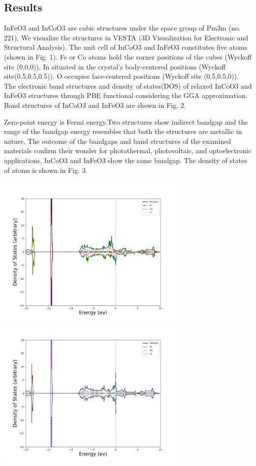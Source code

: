 \documentclass[12pt, letterpaper]{article}
\newcommand*{\1}{\hspace{1pt}}
\begin{document}
    \subsection*{Results}
    InFeO3 and InCoO3 are cubic structures under the space group of Pm3m (no. 221). We visualize the structures in VESTA (3D Visualization for Electronic and 
    Structural Analysis). The unit cell of InCoO3 and InFeO3 constitutes five atoms (shown in Fig. 1). Fe or Co atoms hold the corner positions of the cubes (Wyckoff 
    site (0,0,0)), In situated in the crystal's body-centered positions (Wyckoff site(0.5,0.5,0.5)). O occupies face-centered positions (Wyckoff site (0.5,0.5,0)). 
    The electronic band structures and density of states(DOS) of relaxed InCoO3 and InFeO3 structures through PBE functional considering the GGA approximation. 
    Band structures of InCoO3 and InFeO3 are shown in Fig. 2.  


    
    Zero-point energy is Fermi energy.Two structures show indirect bandgap and the range of the bandgap 
    energy resembles that both the structures are metallic in nature. The outcome of the bandgaps and band structures of the examined materials confirm their wonder
    for photothermal, photovoltaic, and optoelectronic applications. InCoO3 and InFeO3 show the same bandgap. The density of states of atoms is shown in Fig. 3.
    
    \begin{adjustbox}{center,caption={Density of States Of InCoO3 and InFeO3},label={somelabel},nofloat=figure,vspace=\bigskipamount,}
        \includegraphics[width=0.7\textwidth]{DosInCoO3}
        \includegraphics[width=0.7\textwidth]{DosInFeO3}
    \end{adjustbox}
    
\end{document}
